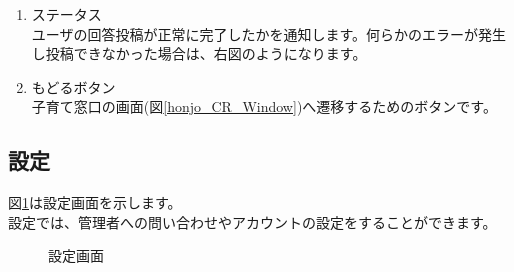 \documentclass[a4j]{jarticle}
\begin{document}
\begin{enumerate}
  \renewcommand{\labelenumi}{\textcircled{\scriptsize \theenumi}}
  \item ステータス\\
        ユーザの回答投稿が正常に完了したかを通知します。何らかのエラーが発生し投稿できなかった場合は、右図のようになります。
  \item もどるボタン\\
        子育て窓口の画面(図\ref{honjo_CR_Window})へ遷移するためのボタンです。
\end{enumerate}

\newpage
\subsection{設定}
図\ref{configuration}は設定画面を示します。\\
設定では、管理者への問い合わせやアカウントの設定をすることができます。

\begin{figure}[H]
    \begin{center}
    \caption {設定画面}
    \label{configuration}
    \end{center}
\end{figure}
\end{document}
